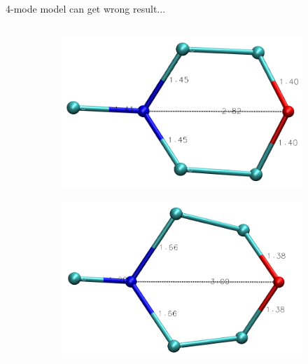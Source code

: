 \documentclass{beamer}
\begin{document}
\begin{frame}{4-mode model can get wrong result...}
\begin{columns}
\begin{column}{0.5\textwidth}
	\vspace{-5mm}
\begin{figure}
	\centering
	\begin{subfigure}[b]{0.4\textwidth}
		\centering
		\includegraphics[width=\textwidth]{argmin_traj_50000_vstrongmodes_frame0.png}
	\end{subfigure}
	\begin{subfigure}[b]{0.4\textwidth}
		\centering
		\includegraphics[width=\textwidth]{argmin_traj_50000_vstrongmodes_frame36.png}
	\end{subfigure}
\end{figure}
\begin{figure}
	\centering
	\begin{subfigure}[b]{\textwidth}

\end{subfigure}
\end{figure}
\end{column}
\end{columns}
\end{frame}
\end{document}
